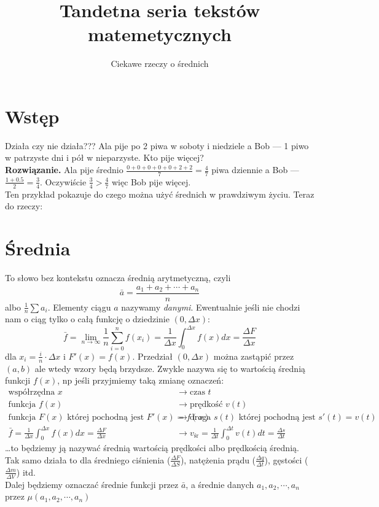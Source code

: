 \documentclass{article}
\title{Tandetna seria tekstów matemetycznych}
\author{Ciekawe rzeczy o średnich}
\begin{document}
\maketitle
\section{Wstęp}
Działa czy nie działa??? Ala pije po 2 piwa w soboty i niedziele a Bob --- 1 piwo w patrzyste dni i pół w nieparzyste. Kto pije więcej?\\
\textbf{Rozwiązanie.} Ala pije średnio $\frac{0+0+0+0+0+2+2}7=\frac47$ piwa dziennie a Bob --- $\frac{1+0.5}2=\frac34$. Oczywiście $\frac34>\frac47$ więc Bob pije więcej.\\
Ten przykład pokazuje do czego można użyć średnich w prawdziwym życiu. Teraz do rzeczy:
\section{Średnia}
To słowo bez kontekstu oznacza średnią arytmetyczną, czyli\[\bar a = \frac{a_1+a_2+\cdots+a_n}n\]albo $\frac1n\sum a_i$. Elementy ciągu $a$ nazywamy \textit{danymi}.
Ewentualnie jeśli nie chodzi nam o ciąg tylko o całą funkcję o dziedzinie $(0, \Delta x)$:
\[\bar f = \lim_{n\to\infty}\frac1n\sum_{i=0}^{n} f(x_i) = \frac1{\Delta x}\int_0^{\Delta x}f(x)dx = \frac{\Delta F}{\Delta x}\]
dla $x_i=\frac in\cdot\Delta x$ i $F'(x)=f(x)$.
Przedział $(0, \Delta x)$ można zastąpić przez $(a, b)$ ale wtedy wzory będą brzydsze. 
Zwykle nazywa się to wartością średnią funkcji $f(x)$, np jeśli przyjmiemy taką zmianę oznaczeń:
\begin{align*}
	\text{współrzędna } x &\to \text{czas }t\\
	\text{funkcja }f(x) &\to \text{prędkość }v(t)\\
	\text{funkcja }F(x)\text{ której pochodną jest }F'(x)=f(x) &\to \text{droga }s(t)\text{ której pochodną jest }s'(t)=v(t)\\
	\bar f = \frac1{\Delta x}\int_0^{\Delta x}f(x)dx = \frac{\Delta F}{\Delta x} &\to v_\text{śr} = \frac1{\Delta t}\int_0^{\Delta t}v(t)dt = \frac{\Delta s}{\Delta t}
\end{align*}
…to będziemy ją nazywać średnią wartością prędkości albo prędkością średnią.
Tak samo działa to dla średniego ciśnienia ($\frac{\Delta F}{\Delta S}$), natężenia prądu ($\frac{\Delta q}{\Delta t}$), gęstości ($\frac{\Delta m}{\Delta V}$) itd.\\
Dalej będziemy oznaczać średnie funkcji przez $\bar a$, a średnie danych $a_1, a_2, \cdots, a_n$ przez $\mu(a_1, a_2, \cdots, a_n)$
\end{document}
